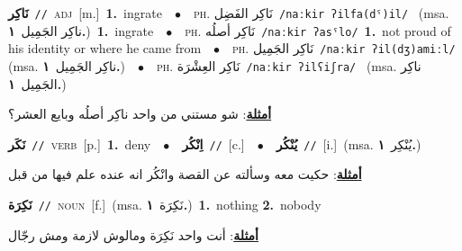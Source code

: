 \documentclass[10pt,a4paper,twoside]{article} %
\begin{document}
\begin{multicols}{2}
{\setlength\topsep{0pt}\textbf{\foreignlanguage{arabic}{نَاكِر}}\ {\color{gray}\texttt{//}\color{black}}\ \textsc{adj}\ [m.]\ \textbf{1.}~ingrate\ \ $\bullet$\ \ \textsc{ph.} \color{gray} \foreignlanguage{arabic}{نَاكِر الفَضِل}\color{black}\ {\color{gray}\texttt{/{\sffamily naːkir ʔilfa(dˤ)il}/}\color{black}}\ \color{gray} (msa. \foreignlanguage{arabic}{ناكِر الجَمِيل}~\foreignlanguage{arabic}{\textbf{١.}})\color{black}\ \textbf{1.}~ingrate\ \ $\bullet$\ \ \textsc{ph.} \color{gray} \foreignlanguage{arabic}{نَاكِر أصلُه}\color{black}\ {\color{gray}\texttt{/{\sffamily naːkir ʔasˤlo}/}\color{black}}\ \textbf{1.}~not proud of his identity or where he came from\ \ $\bullet$\ \ \textsc{ph.} \color{gray} \foreignlanguage{arabic}{نَاكِر الجَمِيل}\color{black}\ {\color{gray}\texttt{/{\sffamily naːkir ʔil(dʒ)amiːl}/}\color{black}}\ \color{gray} (msa. \foreignlanguage{arabic}{ناكِر الجَمِيل}~\foreignlanguage{arabic}{\textbf{١.}})\color{black}\ \ $\bullet$\ \ \textsc{ph.} \color{gray} \foreignlanguage{arabic}{نَاكِر العِشْرَة}\color{black}\ {\color{gray}\texttt{/{\sffamily naːkir ʔilʕiʃra}/}\color{black}}\ \color{gray} (msa. \foreignlanguage{arabic}{ناكِر الجَمِيل}~\foreignlanguage{arabic}{\textbf{١.}})\color{black}\  \begin{flushright}\color{gray}\foreignlanguage{arabic}{\textbf{\underline{\foreignlanguage{arabic}{أمثلة}}}: شو مستني من واحد ناكِر أصلُه وبايع العشر؟}\end{flushright}\color{black}} \vspace{2mm}

{\setlength\topsep{0pt}\textbf{\foreignlanguage{arabic}{نَكَر}}\ {\color{gray}\texttt{//}\color{black}}\ \textsc{verb}\ [p.]\ \textbf{1.}~deny\ \ $\bullet$\ \ \setlength\topsep{0pt}\textbf{\foreignlanguage{arabic}{اِنْكُر}}\ {\color{gray}\texttt{//}\color{black}}\ [c.]\ \ $\bullet$\ \ \setlength\topsep{0pt}\textbf{\foreignlanguage{arabic}{يُنْكُر}}\ {\color{gray}\texttt{//}\color{black}}\ [i.]\ \color{gray}(msa. \foreignlanguage{arabic}{يُنْكِر}~\foreignlanguage{arabic}{\textbf{١.}})\color{black}\  \begin{flushright}\color{gray}\foreignlanguage{arabic}{\textbf{\underline{\foreignlanguage{arabic}{أمثلة}}}: حكيت معه وسألته عن القصة وانْكُر انه عنده علم فيها من قبل}\end{flushright}\color{black}} \vspace{2mm}

{\setlength\topsep{0pt}\textbf{\foreignlanguage{arabic}{نَكِرَة}}\ {\color{gray}\texttt{//}\color{black}}\ \textsc{noun}\ [f.]\ \color{gray}(msa. \foreignlanguage{arabic}{نَكِرَة}~\foreignlanguage{arabic}{\textbf{١.}})\color{black}\ \textbf{1.}~nothing  \textbf{2.}~nobody\  \begin{flushright}\color{gray}\foreignlanguage{arabic}{\textbf{\underline{\foreignlanguage{arabic}{أمثلة}}}: أنت واحد نَكِرَة ومالوش لازمة ومش رجّال}\end{flushright}\color{black}} \vspace{2mm}


\end{multicols}
\end{document}
